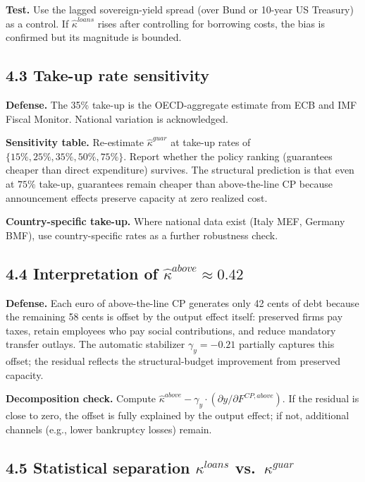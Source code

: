 \documentclass[11pt,a4paper]{article}
\begin{document}
\textbf{Test.} Use the lagged sovereign-yield spread (over Bund or 10-year US Treasury) as a control. If $\hat\kappa^{loans}$ rises after controlling for borrowing costs, the bias is confirmed but its magnitude is bounded.

\subsection*{4.3 Take-up rate sensitivity}

\textbf{Defense.} The 35\% take-up is the OECD-aggregate estimate from ECB and IMF Fiscal Monitor. National variation is acknowledged.

\textbf{Sensitivity table.} Re-estimate $\hat\kappa^{guar}$ at take-up rates of $\{15\%, 25\%, 35\%, 50\%, 75\%\}$. Report whether the policy ranking (guarantees cheaper than direct expenditure) survives. The structural prediction is that even at $75\%$ take-up, guarantees remain cheaper than above-the-line CP because announcement effects preserve capacity at zero realized cost.

\textbf{Country-specific take-up.} Where national data exist (Italy MEF, Germany BMF), use country-specific rates as a further robustness check.

\subsection*{4.4 Interpretation of $\hat\kappa^{above} \approx 0.42$}

\textbf{Defense.} Each euro of above-the-line CP generates only 42 cents of debt because the remaining 58 cents is offset by the output effect itself: preserved firms pay taxes, retain employees who pay social contributions, and reduce mandatory transfer outlays. The automatic stabilizer $\gamma_y = -0.21$ partially captures this offset; the residual reflects the structural-budget improvement from preserved capacity.

\textbf{Decomposition check.} Compute $\hat\kappa^{above} - \gamma_y \cdot (\partial y / \partial F^{CP, above})$. If the residual is close to zero, the offset is fully explained by the output effect; if not, additional channels (e.g., lower bankruptcy losses) remain.

\subsection*{4.5 Statistical separation $\kappa^{loans}$ vs.\ $\kappa^{guar}$}
\end{document}
